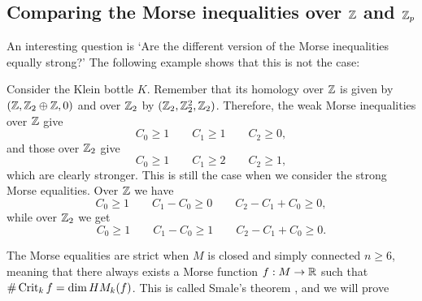 \subsection{Comparing the Morse inequalities over $\Z$ and $\Z_p$}

An interesting question is `Are the different version of the Morse inequalities equally strong?'
The following example shows that this is not the case:

\begin{eg}
    Consider the Klein bottle $K$.
    Remember that its homology over $\Z$ is given by $(\Z, \Z_2 \oplus \Z, 0)$ and over $ \Z_2$ by $(\Z_2, \Z_2^2, \Z_2)$.
    Therefore, the weak Morse inequalities over $\Z$ give
    \[
    C_0 \ge 1 \qquad C_1 \ge 1 \qquad C_2 \ge 0
    ,\]
    and those over $\Z_2$ give
    \[
    C_0 \ge  1 \qquad C_1 \ge  2 \qquad C_2 \ge  1
    ,\]
    which are clearly stronger.
    This is still the case when we consider the strong Morse equalities. Over $ \Z$ we have
    \[
    C_0 \ge  1 \qquad C_1 - C_0 \ge  0 \qquad C_2 - C_1 + C_0 \ge  0
    ,\]
    while over $\Z_2$ we get
    \[
    C_0 \ge  1 \qquad C_1 - C_0 \ge  1 \qquad C_2 - C_1 + C_0 \ge  0
    .\]
\end{eg}

\begin{remark}
    The Morse equalities are strict when $M$ is closed and simply connected $n\ge 6$, meaning that there always exists a Morse function $f: M \to  \R$ such that $\# \Crit_k f = \dim \HMf[k]f$. This is called Smale's theorem , and we will prove 
\end{remark}





